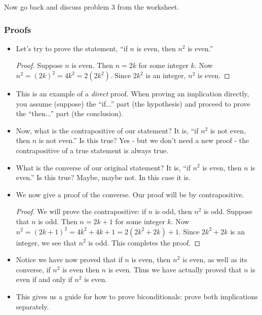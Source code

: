 Now go back and discuss problem 3 from the worksheet.

\subsubsection*{Proofs}
\begin{itemize}
  \item Let's try to prove the statement, ``if $n$ is even, then $n^2$ is even.''
  \begin{proof}
    Suppose $n$ is even.  Then $n = 2k$ for some integer $k$.  Now $n^2 = (2k)^2 = 4k^2 = 2(2k^2)$.  Since $2k^2$ is an integer, $n^2$ is even.
  \end{proof}
  \item This is an example of a {\em direct} proof.  When proving an implication directly, you assume (suppose) the ``if...'' part (the hypothesis) and proceed to prove the ``then...'' part (the conclusion).
  \item Now, what is the contrapositive of our statement?  It is, ``if $n^2$ is not even, then $n$ is not even.''  Is this true?  Yes - but we don't need a new proof - the contrapositive of a true statement is always true.
  \item What is the converse of our original statement?  It is, ``if $n^2$ is even, then $n$ is even.''  Is this true?  Maybe, maybe not.  In this case it is.
  \item We now give a proof of the converse.  Our proof will be by contrapositive.
  \begin{proof}
    We will prove the contrapositive: if $n$ is odd, then $n^2$ is odd.  Suppose that $n$ is odd.  Then $n= 2k+1$ for some integer $k$.  Now $n^2 = (2k+1)^2 = 4k^2 + 4k + 1 = 2(2k^2 + 2k) + 1$.  Since $2k^2 + 2k$ is an integer, we see that $n^2$ is odd.  This completes the proof.
  \end{proof}
  \item Notice we have now proved that if $n$ is even, then $n^2$ is even, as well as its converse, if $n^2$ is even then $n$ is even.  Thus we have actually proved that $n$ is even if and only if $n^2$ is even.
  \item This gives us a guide for how to prove biconditionals: prove both implications separately.
\end{itemize}


